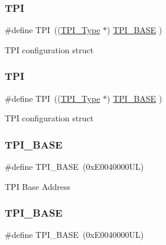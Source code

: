 \subsubsection{\texorpdfstring{TPI}{TPI}\hspace{0.1cm}{\footnotesize\ttfamily [7/8]}}
{\footnotesize\ttfamily \#define T\+PI~((\mbox{\hyperlink{struct_t_p_i___type}{T\+P\+I\+\_\+\+Type}}       $\ast$)     \mbox{\hyperlink{group___c_m_s_i_s__core__base_ga2b1eeff850a7e418844ca847145a1a68}{T\+P\+I\+\_\+\+B\+A\+SE}}         )}

T\+PI configuration struct \mbox{\label{group___c_m_s_i_s__core__base_ga8b4dd00016aed25a0ea54e9a9acd1239}} 
\subsubsection{\texorpdfstring{TPI}{TPI}\hspace{0.1cm}{\footnotesize\ttfamily [8/8]}}
{\footnotesize\ttfamily \#define T\+PI~((\mbox{\hyperlink{struct_t_p_i___type}{T\+P\+I\+\_\+\+Type}}       $\ast$)     \mbox{\hyperlink{group___c_m_s_i_s__core__base_ga2b1eeff850a7e418844ca847145a1a68}{T\+P\+I\+\_\+\+B\+A\+SE}}         )}

T\+PI configuration struct \mbox{\label{group___c_m_s_i_s__core__base_ga2b1eeff850a7e418844ca847145a1a68}} 
\subsubsection{\texorpdfstring{TPI\_BASE}{TPI\_BASE}\hspace{0.1cm}{\footnotesize\ttfamily [1/8]}}
{\footnotesize\ttfamily \#define T\+P\+I\+\_\+\+B\+A\+SE~(0x\+E0040000\+U\+L)}

T\+PI Base Address \mbox{\label{group___c_m_s_i_s__core__base_ga2b1eeff850a7e418844ca847145a1a68}} 
\subsubsection{\texorpdfstring{TPI\_BASE}{TPI\_BASE}\hspace{0.1cm}{\footnotesize\ttfamily [2/8]}}
{\footnotesize\ttfamily \#define T\+P\+I\+\_\+\+B\+A\+SE~(0x\+E0040000\+U\+L)}

